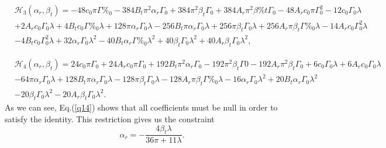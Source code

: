 \documentclass[aps,preprint,onecolumn,11pt,showkeys]{revtex4}%
\begin{document}
\begin{align}
&  \left.  \mathcal{H}_{3}(\alpha_{r},\beta_{t})=-48c_{0}\pi\text{$\Gamma$%
}_{0}-384B_{t}\pi^{2}\text{$\alpha$}_{r}\text{$\Gamma$}_{0}+384\pi
^{2}\text{$\beta$}_{t}\text{$\Gamma$}_{0}+384A_{r}\pi^{2}\text{$\beta$%
}t\text{$\Gamma$}_{0}-48A_{r}c_{0}\pi\text{$\Gamma$}_{0}^{2}-12c_{0}%
\text{$\Gamma$}_{0}\lambda\right.  \nonumber\\
&  \left.  +2A_{r}c_{0}\text{$\Gamma$}_{0}\lambda+4B_{t}c_{0}\text{$\Gamma$%
}_{0}\lambda+128\pi\text{$\alpha$}_{r}\text{$\Gamma$}_{0}\lambda-256B_{t}%
\pi\text{$\alpha$}_{r}\text{$\Gamma$}_{0}\lambda+256\pi\text{$\beta$}%
_{t}\text{$\Gamma$}_{0}\lambda+256A_{r}\pi\text{$\beta$}_{t}\text{$\Gamma$%
}_{0}\lambda-14A_{r}c_{0}\text{$\Gamma$}_{0}^{2}\lambda\right.  \nonumber\\
&  \left.  -4B_{t}c_{0}\text{$\Gamma$}_{0}^{2}\lambda+32\text{$\alpha$}%
_{r}\text{$\Gamma$}_{0}\lambda^{2}-40B_{t}\text{$\alpha$}_{r}\text{$\Gamma$%
}_{0}\lambda^{2}+40\text{$\beta$}_{t}\text{$\Gamma$}_{0}\lambda^{2}%
+40A_{r}\text{$\beta$}_{t}\text{$\Gamma$}_{0}\lambda^{2},\right.
\end{align}
%

\begin{align}
& \left.  \mathcal{H}_{4}(\alpha_{r},\beta_{t})=24c_{0}\pi\text{$\Gamma$}%
_{0}+24A_{r}c_{0}\pi\text{$\Gamma$}_{0}+192B_{t}\pi^{2}\text{$\alpha$}%
_{r}\text{$\Gamma$}_{0}-192\pi^{2}\text{$\beta$}_{t}\text{$\Gamma$}%
{0}-192A_{r}\pi^{2}\text{$\beta$}_{t}\text{$\Gamma$}_{0}+6c_{0}\text{$\Gamma
$}_{0}\lambda+6A_{r}c_{0}\text{$\Gamma$}_{0}\lambda\right.  \nonumber\\
& \left.  -64\pi\text{$\alpha$}_{r}\text{$\Gamma$}_{0}\lambda+128B_{t}%
\pi\text{$\alpha$}_{r}\text{$\Gamma$}_{0}\lambda-128\pi\text{$\beta$}%
_{t}\text{$\Gamma$}_{0}\lambda-128A_{r}\pi\text{$\beta$}_{t}\text{$\Gamma$%
}_{0}\lambda-16\text{$\alpha$}_{r}\text{$\Gamma$}_{0}\lambda^{2}%
+20B_{t}\text{$\alpha$}_{r}\text{$\Gamma$}_{0}\lambda^{2}\right.  \nonumber\\
& \left.  -20\text{$\beta$}_{t}\text{$\Gamma$}_{0}\lambda^{2}-20A_{r}%
\text{$\beta$}_{t}\text{$\Gamma$}_{0}\lambda^{2}.\right.
\end{align}
As we can see, Eq.(\ref{q14}) shows that all coefficients must be null in
order to satisfy the identity. This restriction gives us the constraint%
\begin{equation}
\alpha_{r}=-\frac{4\beta_{t}\lambda}{36\pi+11\lambda}.\label{q15}%
\end{equation}
\end{document}
